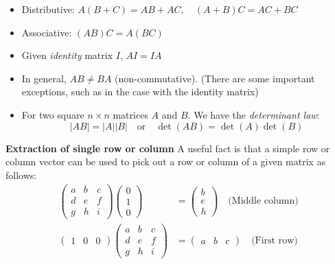 \documentclass{report}
\begin{document}
\begin{itemize}
\item Distributive: $A(B+C)=AB+AC,\quad(A+B)C=AC+BC$
\item Associative: $(AB)C=A(BC)$
\item Given \textit{identity} matrix $I$, $AI=IA$
\item In general, $AB\neq BA$ (non-commutative). (There are some important exceptions, such as 
in the case with the identity matrix)
\item For two square $n\times n$ matrices $A$ and $B$. We have the \textit{determinant law}:
\begin{equation*}
|AB|=|A||B|\quad\text{or}\quad\det(AB)=\det(A)\det(B)
\end{equation*}
\end{itemize}
\textbf{Extraction of single row or column}
A useful fact is that a simple row or column vector can be used to pick out a row or column of 
a given matrix as follows:
\begin{align*}
\begin{pmatrix}
a & b & c\\
d & e & f\\
g & h & i
\end{pmatrix}
\begin{pmatrix}
0\\1\\0
\end{pmatrix}
&=
\begin{pmatrix}
b\\e\\h
\end{pmatrix}
\quad\text{(Middle column)}\\
\begin{pmatrix}
1&0&0
\end{pmatrix}
\begin{pmatrix}
a & b & c\\
d & e & f\\
g & h & i
\end{pmatrix}
&=
\begin{pmatrix}
a&b&c
\end{pmatrix}
\quad\text{(First row)}
\end{align*}
\newpage
\end{document}
